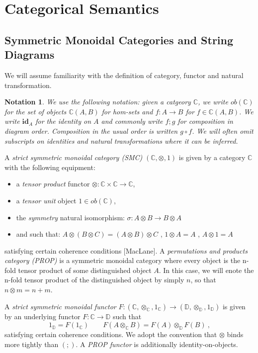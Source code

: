\newtheorem*{notation*}{Notation}

\section{Categorical Semantics}

\subsection{Symmetric Monoidal Categories and String Diagrams}

We will assume familiarity with the definition of category,  functor and natural transformation.
\begin{notation*}
We use the following notation: given a catgeory $\mathbb{C}$, we write $ob(\mathbb{C})$ for the set of objects $\mathbb{C}(A,B)$ for hom-sets and $f: A \to B$ for $f \in \mathbb{C}(A,B)$. We write $\textbf{id}_A$ for the identity on $A$ and commonly write $f;g$ for composition in diagram order.  Composition in the usual order is written $g \circ f$. 
We will often omit subscripts on identities and natural transformations where it can be inferred. 
\end{notation*}
\begin{definition}
A \textit{strict symmetric monoidal category (SMC)} $(\mathbb{C}, \otimes, 1)$ is given by a category $\mathbb{C}$ with the following equipment: 
\begin{itemize}
\item a \textit{tensor product} functor $\otimes: \mathbb{C} \times \mathbb{C} \to \mathbb{C}$,
\item a \textit{tensor unit} object $1 \in ob(\mathbb{C})$, 
\item the \textit{symmetry} natural isomorphism: $\sigma: A \otimes B \to B \otimes A$
\item and such that: $A \otimes (B \otimes C) = (A \otimes B) \otimes C$ ,  $1 \otimes A = A$ ,  $A \otimes 1 = A$
\end{itemize}
satisfying certain coherence conditions [MacLane].  A \textit{permutations and products category (PROP)} is a symmetric monoidal category where every object is the n-fold tensor product of some distinguished object $A$. In this case, we will enote the n-fold tensor product of the distinguished object by simply $n$, so that $n \otimes m = n+m$.

A \textit{strict symmetric monoidal functor} $F: (\mathbb{C}, \otimes_\mathbb{C}, 1_\mathbb{C}) \to (\mathbb{D}, \otimes_\mathbb{D}, 1_\mathbb{D})$ is given by an underlying functor $F: \mathbb{C} \to \mathbb{D}$ such that 
\[
 1_{\mathbb{D}} = F(1_{\mathbb{C}})
 \qquad F(A \otimes_{\mathbb{C}} B) = F(A) \otimes_{\mathbb{D}} F(B)\ ,
\]
satisfying certain coherence conditions. 
We adopt the convention that $\otimes$ binds more tightly than $(;\!)$. 
A \textit{PROP functor} is additionally identity-on-objects. 
\end{definition}


